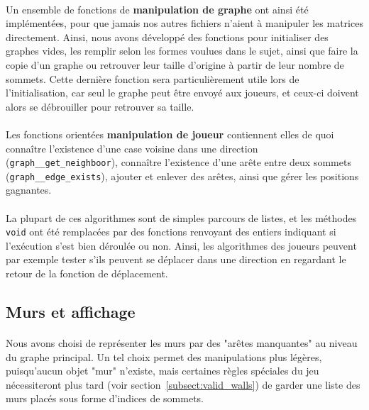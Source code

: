 \documentclass[a4paper]{article}
\begin{document}
\paragraph{}
Un ensemble de fonctions de \textbf{manipulation de graphe} ont ainsi été implémentées, pour que jamais nos autres fichiers n'aient à manipuler les matrices directement. Ainsi, nous avons développé des fonctions pour initialiser des graphes vides, les remplir selon les formes voulues dans le sujet, ainsi que faire la copie d'un graphe ou retrouver leur taille d'origine à partir de leur nombre de sommets. Cette dernière fonction sera particulièrement utile lors de l'initialisation, car seul le graphe peut être envoyé aux joueurs, et ceux-ci doivent alors se débrouiller pour retrouver sa taille.

\paragraph{}
Les fonctions orientées \textbf{manipulation de joueur} contiennent elles de quoi connaître l'existence d'une case voisine dans une direction (\texttt{graph\_\_get\_neighboor}), connaître l'existence d'une arête entre deux sommets (\texttt{graph\_\_edge\_exists}), ajouter et enlever des arêtes, ainsi que gérer les positions gagnantes.

\paragraph{}
La plupart de ces algorithmes sont de simples parcours de listes, et les méthodes \texttt{void} ont été remplacées par des fonctions renvoyant des entiers indiquant si l'exécution s'est bien déroulée ou non. Ainsi, les algorithmes des joueurs peuvent par exemple tester s'ils peuvent se déplacer dans une direction en regardant le retour de la fonction de déplacement.

\subsection{Murs et affichage}
\paragraph{}
Nous avons choisi de représenter les murs par des "arêtes manquantes" au niveau du graphe principal. Un tel choix permet des manipulations plus légères, puisqu'aucun objet "mur" n'existe, mais certaines règles spéciales du jeu nécessiteront plus tard (voir section~\ref{subsect:valid_walls}) de garder une liste des murs placés sous forme d'indices de sommets. 
\end{document}
